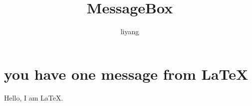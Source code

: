 \documentclass[a4paper, 12pt]{article}
\title{MessageBox}
\author{liyang}
\date{}
\begin{document}
  
  \maketitle

  \section{you have one message from \LaTeX}
     Hello, I am \LaTeX.
\end{document}
